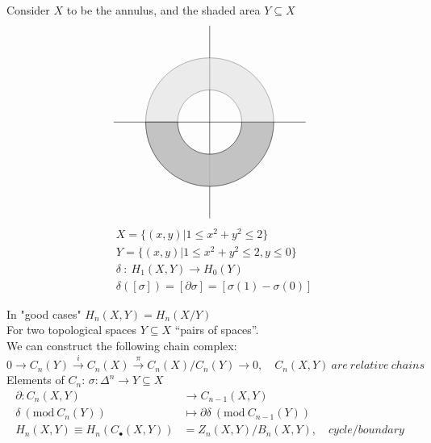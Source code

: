 \documentclass[11pt,a4paper]{report}
\begin{document}
                \begin{Ex} Consider $X$ to be the annulus, and the shaded area $Y \subseteq X$
                \[
                \begin{tikzpicture}
                    \draw (-3,0) -- (3,0);
                    \draw (0,-3) -- (0,3);
                    \filldraw[fill=gray!30,opacity=0.5] (-180:1) arc (-180:180:1) -- (180:2) arc (180:-180:2) -- cycle;
                    \filldraw[fill=black!30,opacity=0.7] (0:1) arc (0:-180:1) -- (-180:2) arc (-180:0:2) -- cycle;
                    
                \end{tikzpicture}
                \]
                    \begin{align*}
                    &X = \{(x,y) | 1 \le x^2 + y^2 \le 2\}\\
                    &Y = \{(x,y) | 1 \le x^2 + y^2 \le 2, y \le 0\}\\
                    &\delta\ :\ H_1(X,Y) \rightarrow H_0(Y)\\
                    &\delta([\sigma]) = [\partial \sigma] = [\sigma(1) - \sigma(0)]
                    \end{align*}
                \end{Ex}

                In "good cases" $H_n(X,Y) = H_n(X/Y)$ \\
                
            
                For two topological spaces $Y \subseteq X$ ``pairs of spaces''.\\
                We can construct the following chain complex: \\
                $0 \rightarrow C_n(Y) \xrightarrow{i} C_n(X) \xrightarrow{\pi} C_n(X) / C_n(Y) \rightarrow 0, \quad C_n(X, Y)\ are\ relative\ chains$ \\
                Elements of $C_n$: $\sigma: \Delta^n \rightarrow Y \subseteq X$ \\
                
                \newcommand{\Mod}[1]{\ (\mathrm{mod}\ #1)}
                \begin{align*}
                  \partial: C_n(X,Y) &\rightarrow C_{n-1}(X, Y)\\
                  \delta \Mod{C_n(Y)} &\mapsto \partial \delta \Mod{C_{n-1}(Y)}\\
                  H_n(X, Y) \equiv H_n(C_\bullet(X, Y)) &= Z_n(X, Y) / B_n(X, Y),\quad cycle / boundary\\
                \end{align*}
\end{document}
